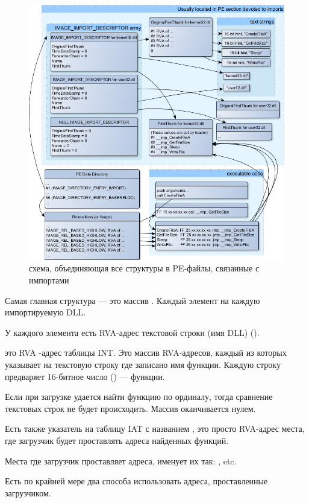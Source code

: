 \begin{figure}[H]
\centering
\includegraphics[scale=\FigScale]{OS/PE/unnamed0.png}
\caption{схема, объединяющая все структуры в PE-файлы, связанные с импортами}
\end{figure}

Самая главная структура --- это массив .
Каждый элемент на каждую импортируемую DLL.

У каждого элемента есть \ac{RVA}-адрес текстовой строки (имя DLL) ().

 это \ac{RVA} -адрес таблицы \ac{INT}.
Это массив \ac{RVA}-адресов, каждый из которых указывает на текстовую строку где записано имя функции. 
Каждую строку предваряет 16-битное число () ---  функции.

Если при загрузке удается найти функцию по ординалу, тогда сравнение текстовых строк не будет происходить.
Массив оканчивается нулем.

Есть также указатель на таблицу \ac{IAT} с названием , это просто \ac{RVA}-адрес места, где загрузчик будет проставлять адреса найденных функций.

Места где загрузчик проставляет адреса, \IDA именует их так: , etc.

Есть по крайней мере два способа использовать адреса, проставленные загрузчиком.

